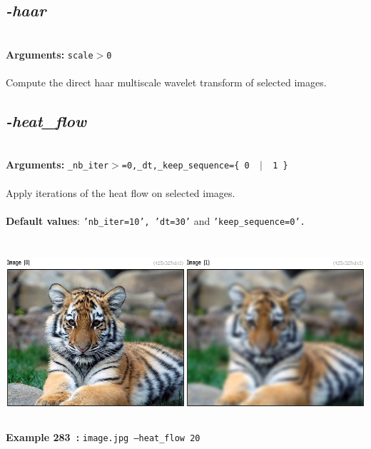 \documentclass[a4paper,11pt,twoside]{book}
\begin{document}
\subsection{\emph{-haar} }\vspace*{-0.5em}
~\\\textbf{Arguments: } 
{\small \texttt{scale$>$0}}\\~\\
Compute the direct haar multiscale wavelet transform of selected images.


\subsection{\emph{-heat\_flow} }\vspace*{-0.5em}
~\\\textbf{Arguments: } 
{\small \texttt{\_nb\_iter$>$=0,\_dt,\_keep\_sequence=\{ 0 ~$|$~ 1 \}}}\\~\\
Apply iterations of the heat flow on selected images.
~\\~\\\textbf{Default values}: {\small \texttt{'nb\_iter=10', 'dt=30'} and \texttt{'keep\_sequence=0'.}}
\begin{center}\includegraphics[keepaspectratio=true,height=7cm,width=\textwidth]{img/gmic_def283.jpg}\\
{\footnotesize \textbf{Example 283~:} \texttt{image.jpg --heat\_flow 20}}
\end{center}
\end{document}
